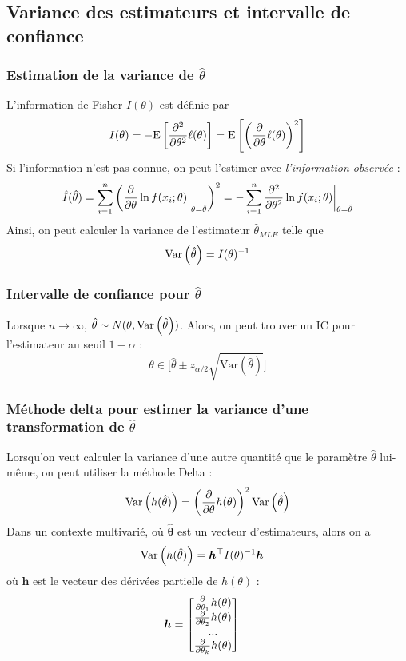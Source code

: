 \documentclass[french, landscape]{article}
\begin{document}
\begin{multicols*}{3}
\subsection*{Variance des estimateurs et intervalle de confiance}



\subsubsection*{Estimation de la variance de $\hat{\theta}$}
L'information de Fisher $I(\theta)$ est définie par
\[I(\theta) = -\mathrm{E} \left[ \frac{\partial^2}{\partial \theta^2} \ell(\theta) \right] = \mathrm{E} \left[ \left( \frac{\partial}{\partial \theta} \ell(\theta) \right)^2 \right]\]
Si l'information n'est pas connue, on peut l'estimer avec \emph{l'information observée} : 
\[\hat{I}(\hat{\theta}) = \sum_{i=1}^{n} \left( \frac{\partial}{\partial \theta} \ln f(x_i ; \theta) \biggr \rvert_{\theta = \hat{\theta}} \right)^2 = - \sum_{i=1}^{n}  \frac{\partial^2}{\partial \theta^2} \ln f(x_i ; \theta) \biggr \rvert_{\theta = \hat{\theta}}\]
Ainsi, on peut calculer la variance de l'estimateur $\hat{\theta}_{MLE}$ telle que
\[\mathrm{Var} \left( \hat{\theta} \right) = I(\theta)^{-1}\]

\subsubsection*{Intervalle de confiance pour $\hat{\theta}$}
Lorsque $n \to \infty$, $\hat{\theta} \sim N(\theta,	\mathrm{Var} \left( \hat{\theta} \right))$. Alors, on peut trouver un IC pour l'estimateur au seuil $1 - \alpha$ : 
\[\theta \in \Big [   \hat{\theta} \pm z_{\alpha/2} \sqrt{\mathrm{Var}(\hat{\theta})} \Big ]\]


\subsubsection*{Méthode delta pour estimer la variance d'une transformation de $\hat{\theta}$}
Lorsqu'on veut calculer la variance d'une autre quantité que le paramètre $\hat{\theta}$ lui-même, on peut utiliser la méthode Delta : 
\[\mathrm{Var} \left( h(\hat{\theta}) \right)  = \left( \frac{\partial}{\partial \theta} h(\theta) \right)^2 \mathrm{Var} \left( \hat{\theta} \right)\]
Dans un contexte multivarié, où $\bm{\hat{\theta}}$ est un vecteur d'estimateurs, alors on a
\begin{align*}
\mathrm{Var} \left( h(\hat{\theta}) \right)	& = \bm{h}^{\top} I(\theta)^{-1} \bm{h}
\end{align*}
où $\bm{h}$ est le vecteur des dérivées partielle de $h(\theta)$ : 
\begin{align*}
\bm{h}	& = 
\begin{bmatrix}
\frac{\partial}{\partial \theta_1} h(\theta) \\
\frac{\partial}{\partial \theta_2} h(\theta) \\
... \\
\frac{\partial}{\partial \theta_k} h(\theta) \\
\end{bmatrix}
\end{align*}


\end{multicols*}
\end{document}
